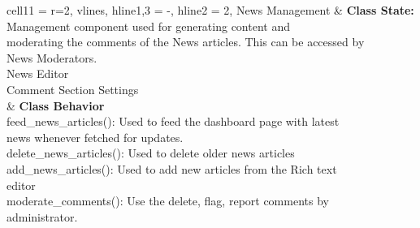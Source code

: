 \documentclass[11pt]{article}
\begin{document}
\begin{longtblr}[
  label = none,
  entry = none,
]{
  cell{1}{1} = {r=2}{},
  vlines,
  hline{1,3} = {-}{},
  hline{2} = {2}{},
}
News Management & {\textbf{Class State: }Management component used for generating content and \\
moderating the comments of the News articles. This can be accessed by \\News
Moderators. \\
\hspace{\dimexpr\labelsep+0.5\tabcolsep}News Editor\\
\hspace{\dimexpr\labelsep+0.5\tabcolsep}Comment Section Settings}\\
                & {\textbf{Class Behavior}\\
\hspace{\dimexpr\labelsep+0.5\tabcolsep}feed\_news\_articles(): Used to feed the dashboard page with latest\\ news
whenever fetched for updates.\\
\hspace{\dimexpr\labelsep+0.5\tabcolsep}delete\_news\_articles(): Used to delete older news articles\\
\hspace{\dimexpr\labelsep+0.5\tabcolsep}add\_news\_articles(): Used
to add new articles from the Rich text \\editor \\
\hspace{\dimexpr\labelsep+0.5\tabcolsep}moderate\_comments(): Use the delete, flag, report comments by \\
administrator.}
\end{longtblr}
\end{document}
